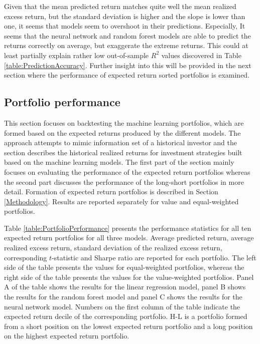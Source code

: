 \documentclass[12pt]{article}
\begin{document}
Given that the mean predicted return matches quite well the mean realized excess return, but the standard deviation is higher and the slope is lower than one, it seems that models seem to overshoot in their predictions. Especially, It seems that the neural network and random forest models are able to predict the returns correctly on average, but exaggerate the extreme returns. This could at least partially explain rather low out-of-sample $R^2$ values discovered in Table \ref{table:PredictionAccuracy}. Further insight into this will be provided in the next section where the performance of expected return sorted portfolios is examined. \par

\subsection{Portfolio performance}\label{PortfolioPerformance}

This section focuses on backtesting the machine learning portfolios, which are formed based on the expected returns produced by the different models. The approach attempts to mimic information set of a historical investor and the section describes the historical realized returns for investment strategies built based on the machine learning models. The first part of the section mainly focuses on evaluating the performance of the expected return portfolios whereas the second part discusses the performance of the long-short portfolios in more detail. Formation of expected return portfolios is described in Section \ref{Methodology}. Results are reported separately for value and equal-weighted portfolios. \par

Table \ref{table:PortfolioPerformance} presents the performance statistics for all ten expected return portfolios for all three models. Average predicted return, average realized excess return, standard deviation of the realized excess return, corresponding $t$-statistic and Sharpe ratio are reported for each portfolio. The left side of the table presents the values for equal-weighted portfolios, whereas the right side of the table presents the values for the value-weighted portfolios. Panel A of the table shows the results for the linear regression model, panel B shows the results for the random forest model and panel C shows the results for the neural network model. Numbers on the first column of the table indicate the expected return decile of the corresponding portfolio. H-L is a portfolio formed from a short position on the lowest expected return portfolio and a long position on the highest expected return portfolio. \par
\end{document}
